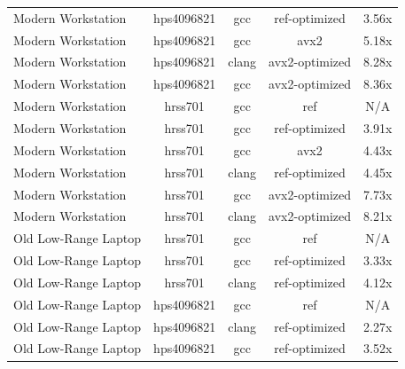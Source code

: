 \begin{table}
\begin{tabularx}{\linewidth}{X c c c c}
          Modern Workstation &           hps4096821 &                  gcc &        ref-optimized &                3.56x\\
          Modern Workstation &           hps4096821 &                  gcc &                 avx2 &                5.18x\\
          Modern Workstation &           hps4096821 &                clang &       avx2-optimized &                8.28x\\
          Modern Workstation &           hps4096821 &                  gcc &       avx2-optimized &                8.36x\\
          Modern Workstation &              hrss701 &                  gcc &                  ref &                  N/A\\
          Modern Workstation &              hrss701 &                  gcc &        ref-optimized &                3.91x\\
          Modern Workstation &              hrss701 &                  gcc &                 avx2 &                4.43x\\
          Modern Workstation &              hrss701 &                clang &        ref-optimized &                4.45x\\
          Modern Workstation &              hrss701 &                  gcc &       avx2-optimized &                7.73x\\
          Modern Workstation &              hrss701 &                clang &       avx2-optimized &                8.21x\\
        Old Low-Range Laptop &              hrss701 &                  gcc &                  ref &                  N/A\\
        Old Low-Range Laptop &              hrss701 &                  gcc &        ref-optimized &                3.33x\\
        Old Low-Range Laptop &              hrss701 &                clang &        ref-optimized &                4.12x\\
        Old Low-Range Laptop &           hps4096821 &                  gcc &                  ref &                  N/A\\
        Old Low-Range Laptop &           hps4096821 &                clang &        ref-optimized &                2.27x\\
        Old Low-Range Laptop &           hps4096821 &                  gcc &        ref-optimized &                3.52x\\

\end{tabularx}
\end{table}
